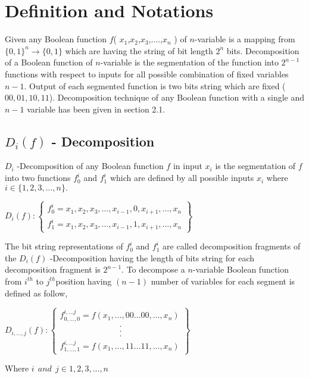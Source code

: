 \documentclass{article}
\begin{document}
\section{Definition and Notations}
Given any Boolean function $f$( $ x_{1} $,$ x_{2} $,$ x_{3} $,....,$ x_{n} $ ) of $n$-variable is a mapping from $\{0,1\}^{n}\rightarrow\{0,1\} $ which are having the string of bit length $2^{n}$ bits. Decomposition of a Boolean function of $n$-variable is the segmentation of the function into $ 2^{n-1}$ functions with respect to inputs for all possible combination of fixed variables $n-1$. Output of each segmented function is two bits string which are fixed ($00,01,10,11$). Decomposition technique of any Boolean function with a single and $n-1$ variable has been given in section 2.1.

\subsection{$D_{i}(f)$ - Decomposition}
\noindent
$D_{i}$ -Decomposition of any Boolean function $f$ in input $x_{i}$ is the segmentation of $f$ into two functions $f_{0}^{i}$ and $ f_{1}^{i}$ which are defined by all possible inputs $x_i$ where $i\in\{1,2,3,...,n\}.$
  
 \begin{center}
   \resizebox{10cm}{!}
   {
    \centering
    $D_{i}(f) :\left \lbrace \begin{array}{c}
   
        f_{0}^i=x_1{},x_{2},x_{3},\ldots,x_{i-1},0,x_{i+1},\ldots, x_{n}\\
        f_{1}^i=x_1{},x_{2},x_{3},\ldots,x_{i-1},1,x_{i+1},\ldots, x_{n}
   				
   \end{array} \right\rbrace$
   }
 \end{center}
 
 The bit string representations of $f_{0}^i$ and $ f_{1}^i$ are called decomposition fragments of the $D_{i}(f)$ -Decomposition having the length of bits string for each decomposition fragment is $2^{n-1}$.
 To decompose a $n$-variable Boolean function from $i^{th}$ to $j^{th}$position having $(n-1)$ number of variables for each segment is defined as follow, 
  \begin{center}
     \resizebox{8cm}{!}
     {
      \centering
      $D_{i,\ldots,j}(f) :\left \lbrace \begin{array}{l}
   
          f_{0,\dots,0}^{i,\ldots j}=f(x_{1},\ldots,00\ldots00,\ldots ,x_{n})\\
                            \hspace{3cm} .\\
                            \hspace{3cm} .\\
                            \hspace{3cm}.\\
          f_{1,\ldots,1}^{i,\ldots j}=f(x_{1},\ldots,11\ldots11,\ldots,x_{n})
     \end{array} \right\rbrace$
     }
   \end{center}
 Where $i\:\: and\:\: j\in {1,2,3,...,n}$
 
\end{document}
